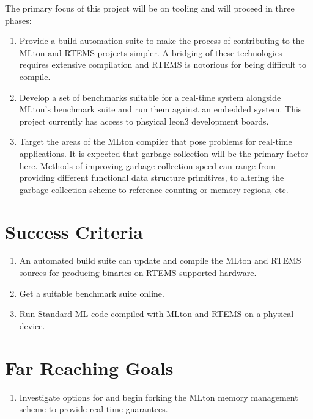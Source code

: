 \documentclass[12pt]{article}
\begin{document}
The primary focus of this project will be on tooling and will proceed in three phases:
\begin{enumerate}
\item Provide a build automation suite to make the process of contributing to the MLton and RTEMS projects simpler. A bridging of these technologies requires extensive compilation and RTEMS is notorious for being difficult to compile.
\item Develop a set of benchmarks suitable for a real-time system alongside MLton's benchmark suite and run them against an embedded system. This project currently has access to phsyical leon3 development boards.
\item Target the areas of the MLton compiler that pose problems for real-time applications. It is expected that garbage collection will be the primary factor here. Methods of improving garbage collection speed can range from providing different functional data structure primitives, to altering the garbage collection scheme to reference counting or memory regions, etc.
\end{enumerate}

\section{Success Criteria}
\begin{enumerate}
\item An automated build suite can update and compile the MLton and RTEMS sources for producing binaries on RTEMS supported hardware.
\item Get a suitable benchmark suite online.
\item Run Standard-ML code compiled with MLton and RTEMS on a physical device.
\end{enumerate}

\section{Far Reaching Goals}
\begin{enumerate}
\item Investigate options for and begin forking the MLton memory management scheme to provide real-time guarantees.
\end{enumerate}
\end{document}
